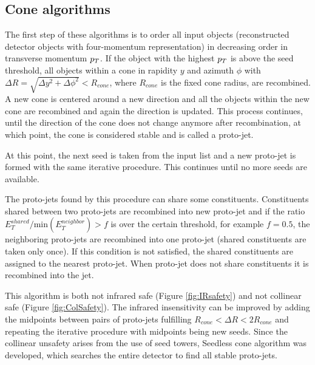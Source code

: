 \subsection{Cone algorithms}

The first step of these algorithms is to order all input objects (reconstructed
detector objects with four-momentum representation) in decreasing order in
transverse momentum $p_{T}$. If the object with the highest $p_{T}$ is above the
seed threshold, all objects within a cone in rapidity $y$ and azimuth
$\phi$ with $\Delta R = \sqrt{\Delta y^2 + \Delta \phi^2} < R_{cone}$, where
$R_{cone}$ is the fixed cone radius, are recombined.
A new cone is centered around a new direction and all the objects within the new
cone are recombined and again the direction is updated. This process continues,
until the direction of the cone does not change anymore after recombination, at
which point, the cone is considered stable and is called a proto-jet. 

At this point, the next seed is taken from the input list and a new proto-jet is
formed with the same iterative procedure. This continues until no more seeds are
available. 

The proto-jets found by this procedure can share some constituents. Constituents
shared between two proto-jets are recombined into new proto-jet and if the ratio
$E_T^{shared} / \text{min} ( E_T^{neighbor} ) > f$ is over the certain
threshold, for example $f = 0.5$, the neighboring proto-jets are recombined into
one proto-jet (shared constituents are taken only once). If this condition is
not satisfied, the shared constituents are assigned to the nearest proto-jet.
When proto-jet does not share constituents it is recombined into the jet.

This algorithm is both not infrared safe (Figure \ref{fig:IRsafety}) and not
collinear safe (Figure \ref{fig:ColSafety}). The infrared insensitivity can be
improved by adding the midpoints between pairs of proto-jets fulfilling
$R_{cone} < \Delta R < 2 R_{cone}$ and repeating the iterative procedure with
midpoints being new seeds. Since the collinear unsafety arises from the use of
seed towers, Seedless cone algorithm was developed, which searches the entire
detector to find all stable proto-jets.

